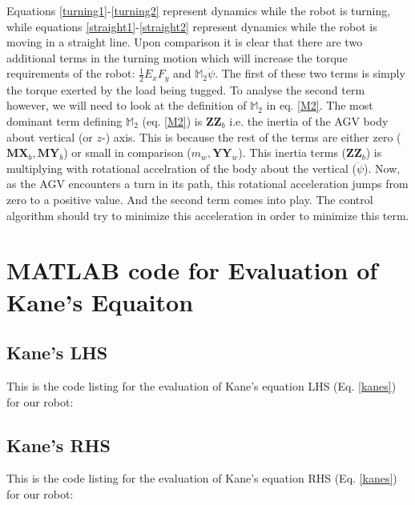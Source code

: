 \documentclass[a4paper,10pt]{article}
\begin{document}
Equations \ref{turning1}-\ref{turning2} represent dynamics while the robot is turning, while equations \ref{straight1}-\ref{straight2} 
represent dynamics while the robot is moving in a straight line. Upon comparison it is clear that there are two additional terms 
in the turning motion which will increase the torque requirements of the robot: $\frac{1}{2}E_xF_y$ and $\mathbb{M}_2\ddot\psi$.
The first of these two terms is simply the torque exerted by the load being tugged. To analyse the second term however, we will need to 
look at the definition of $\mathbb{M}_2$ in eq. \ref{M2}. The most dominant term defining 
$\mathbb{M}_2$ (eq. \ref{M2}) is $\mathbf{ZZ}_b$ i.e. the inertia of the AGV body about vertical (or $z$-) axis. 
This is because the rest of the terms are either zero ($\mathbf{MX}_b, \mathbf{MY}_b$) or small in comparison 
($m_w, \mathbf{YY}_w$). This inertia terms ($\mathbf{ZZ}_b$) is multiplying with rotational accelration of the body about the vertical ($\ddot\psi$).
Now, as the AGV encounters a turn in its path, this rotational acceleration jumps from zero to a positive value. And the second term 
comes into play. The control algorithm should try to minimize this acceleration in order to minimize this term. 


\appendix

\section{MATLAB code for Evaluation of Kane's Equaiton}

\subsection{Kane's LHS} 

This is the code listing for the evaluation of Kane's equation LHS (Eq. \ref{kanes}) for our robot:


\subsection{Kane's RHS} 

This is the code listing for the evaluation of Kane's equation RHS (Eq. \ref{kanes}) for our robot:

\end{document}
